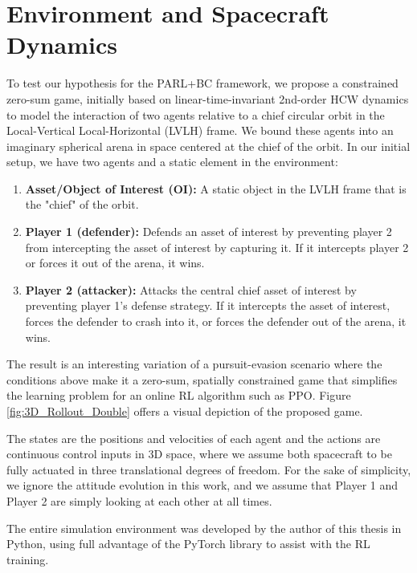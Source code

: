 \chapter{Environment and Spacecraft Dynamics}

To test our hypothesis for the PARL+BC framework, we propose a constrained zero-sum game, initially based on linear-time-invariant 2nd-order HCW dynamics to model the interaction of two agents relative to a chief circular orbit in the Local-Vertical Local-Horizontal (LVLH) frame. We bound these agents into an imaginary spherical arena in space centered at the chief of the orbit. In our initial setup, we have two agents and a static element in the environment:

\begin{enumerate}
\item \textbf{Asset/Object of Interest (OI):} A static object in the LVLH frame that is the "chief" of the orbit. 
\item \textbf{Player 1 (defender):} Defends an asset of interest by preventing player 2 from intercepting the asset of interest by capturing it. If it intercepts player 2 or forces it out of the arena, it wins. 
\item \textbf{Player 2 (attacker):} Attacks the central chief asset of interest by preventing player 1's defense strategy. If it intercepts the asset of interest, forces the defender to crash into it, or forces the defender out of the arena, it wins.
\end{enumerate}

The result is an interesting variation of a pursuit-evasion scenario where the conditions above make it a zero-sum, spatially constrained game that simplifies the learning problem for an online RL algorithm such as PPO. Figure \ref{fig:3D_Rollout_Double} offers a visual depiction of the proposed game.

The states are the positions and velocities of each agent and the actions are continuous control inputs in 3D space, where we assume both spacecraft to be fully actuated in three translational degrees of freedom. For the sake of simplicity, we ignore the attitude evolution in this work, and we assume that Player 1 and Player 2 are simply looking at each other at all times.

The entire simulation environment was developed by the author of this thesis in Python, using full advantage of the PyTorch library to assist with the RL training. 

